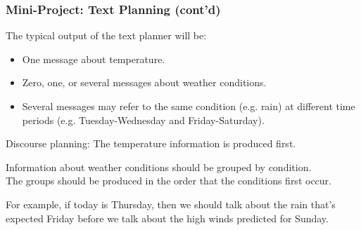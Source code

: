\begin{frame}
\frametitle{Mini-Project: Text Planning (cont'd)}

The typical output of the text planner will be:

\begin{itemize}
	\item One message about temperature.
	
	\item Zero, one, or several messages about weather conditions.
	
	\item Several messages may refer to the same condition (e.g. rain)
	at different time periods (e.g. Tuesday-Wednesday and Friday-Saturday).
\end{itemize}

\vspace{12pt}

Discourse planning: The temperature information is produced first.

\vspace{12pt}

Information about weather conditions should be grouped by condition.\\
The groups should be produced in the order that the conditions first occur.

\vspace{12pt}

For example, if today is Thursday, then we should
talk about the rain that's expected Friday before we talk about the
high winds predicted for Sunday.

\end{frame}